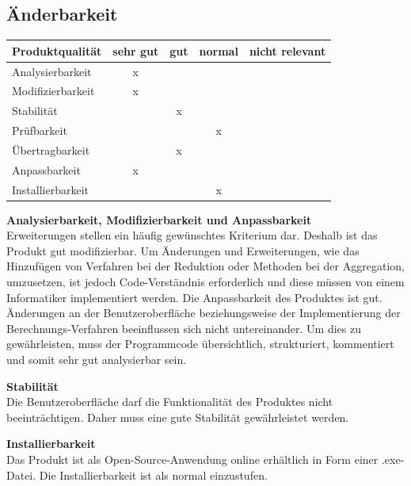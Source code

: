 \documentclass[parskip=full]{scrartcl} %
\begin{document}
\newpage 


\subsection{Änderbarkeit}
    \begin{tabular}{|l| c| c| c| c|}
    \hline
        Produktqualität & sehr gut & gut & normal & nicht relevant \\
    \hline
        Analysierbarkeit & x & & & \\
    \hline
        Modifizierbarkeit & x & & &\\
    \hline
        Stabilität & & x & &\\
    \hline
        Prüfbarkeit & & & x &\\
    \hline
        Übertragbarkeit & & x & &\\
    \hline
        Anpassbarkeit & x & & &\\
    \hline
        Installierbarkeit & & & x &\\
    \hline
    \end{tabular}
    
\textbf{Analysierbarkeit, Modifizierbarkeit und Anpassbarkeit}\\
Erweiterungen stellen ein häufig gewünschtes Kriterium dar. Deshalb ist das Produkt gut modifizierbar. Um Änderungen und Erweiterungen, wie das Hinzufügen von Verfahren bei der Reduktion oder Methoden bei der Aggregation, umzusetzen, ist jedoch Code-Verständnis erforderlich und diese müssen von einem Informatiker implementiert werden. Die Anpassbarkeit des Produktes ist gut. Änderungen an der Benutzeroberfläche beziehungsweise der Implementierung der Berechnungs-Verfahren beeinflussen sich nicht untereinander. Um dies zu gewährleisten, muss der Programmcode übersichtlich, strukturiert, kommentiert und somit sehr gut analysierbar sein.

\textbf{Stabilität}\\
Die Benutzeroberfläche darf die Funktionalität des Produktes nicht beeinträchtigen. Daher muss eine gute Stabilität gewährleistet werden.

\textbf{Installierbarkeit}\\
Das Produkt ist als Open-Source-Anwendung online erhältlich in Form einer .exe-Datei. Die Installierbarkeit ist als normal einzustufen.


\newpage 
\end{document}
